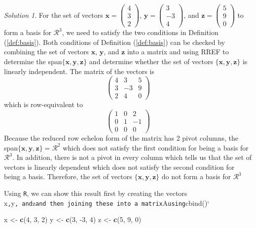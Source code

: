 \documentclass[
]{book}
\newenvironment{Shaded}{\begin{snugshade}}{\end{snugshade}}
\newcommand{\DecValTok}[1]{\textcolor[rgb]{0.00,0.00,0.81}{#1}}
\newcommand{\KeywordTok}[1]{\textcolor[rgb]{0.13,0.29,0.53}{\textbf{#1}}}
\newcommand{\NormalTok}[1]{#1}
\newcommand{\StringTok}[1]{\textcolor[rgb]{0.31,0.60,0.02}{#1}}
\theoremstyle{definition}
\theoremstyle{definition}
\theoremstyle{definition}
\theoremstyle{definition}
\theoremstyle{remark}
\newtheorem*{solution}{Solution}
\begin{document}
\begin{solution}
For the set of vectors \(\mathbf{x} = \begin{pmatrix} 4 \\ 3 \\ 2 \end{pmatrix}\), \(\mathbf{y} = \begin{pmatrix} 3 \\ -3 \\ 4 \end{pmatrix}\), and \(\mathbf{z} = \begin{pmatrix} 5 \\ 9 \\ 0 \end{pmatrix}\) to form a basis for \(\mathcal{R}^3\), we need to satisfy the two conditions in Definition (\ref{def:basis}). Both conditions of Definition (\ref{def:basis}) can be checked by combining the set of vectors \(\mathbf{x}\), \(\mathbf{y}\), and \(\mathbf{z}\) into a matrix and using RREF to determine the span\(\{ \mathbf{x}, \mathbf{y}, \mathbf{z} \}\) and determine whether the set of vectors \(\{ \mathbf{x}, \mathbf{y}, \mathbf{z} \}\) is linearly independent. The matrix of the vectors is
\[
\begin{pmatrix} 4 & 3 & 5 \\ 3 & -3 & 9 \\ 2 & 4 & 0 \end{pmatrix}
\]
which is row-equivalent to
\[
\begin{pmatrix} 1 & 0 & 2 \\ 0 & 1 & -1 \\ 0 & 0 & 0 \end{pmatrix}
\]
Because the reduced row echelon form of the matrix has 2 pivot columns, the span\(\{ \mathbf{x}, \mathbf{y}, \mathbf{z} \} = \mathcal{R}^2\) which does not satisfy the first condition for being a basis for \(\mathcal{R}^3\). In addition, there is not a pivot in every column which tells us that the set of vectors is linearly dependent which does not satisfy the second condition for being a basis. Therefore, the set of vectors \(\{ \mathbf{x}, \mathbf{y}, \mathbf{z} \}\) do not form a basis for \(\mathcal{R}^3\)

Using \texttt{R}, we can show this result first by creating the vectors x\texttt{,}y\texttt{,\ and}z\texttt{and\ then\ joining\ these\ into\ a\ matrix}A\texttt{using}cbind()`

\begin{Shaded}
\begin{Highlighting}[]
\NormalTok{x <-}\StringTok{ }\KeywordTok{c}\NormalTok{(}\DecValTok{4}\NormalTok{, }\DecValTok{3}\NormalTok{, }\DecValTok{2}\NormalTok{)}
\NormalTok{y <-}\StringTok{ }\KeywordTok{c}\NormalTok{(}\DecValTok{3}\NormalTok{, }\DecValTok{-3}\NormalTok{, }\DecValTok{4}\NormalTok{)}
\NormalTok{z <-}\StringTok{ }\KeywordTok{c}\NormalTok{(}\DecValTok{5}\NormalTok{, }\DecValTok{9}\NormalTok{, }\DecValTok{0}\NormalTok{)}


\end{Highlighting}
\end{Shaded}
\end{solution}
\end{document}
